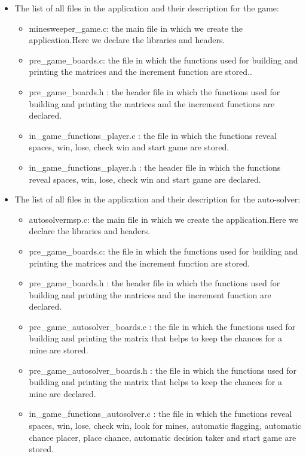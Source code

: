 \documentclass{article}
\begin{document}
\begin{itemize}
    
\item The list of all files in the application and their description for the game:
 \begin{itemize}
 	\item minesweeper\_game.c: the main file in which we create the application.Here we declare the libraries and headers.
 	\item pre\_game\_boards.c: the file in which the functions used for building and printing the matrices and the increment function are stored..
 	\item pre\_game\_boards.h : the header file in which the functions used for building and printing the matrices and the increment functions are declared.
 	\item in\_game\_functions\_player.c : the file in which the functions reveal spaces, win, lose, check win and start game are stored.
 	\item in\_game\_functions\_player.h : the header file in which the functions reveal spaces, win, lose, check win and start game are declared.
 	
 \end{itemize}
 
 
 \item The list of all files in the application and their description for the auto-solver:
 \begin{itemize}
 	\item autosolvermsp.c: the main file in which we create the application.Here we declare the libraries and headers.
 	
 	\item pre\_game\_boards.c: the file in which the functions used for building and printing the matrices and the increment function are stored.
 	
 	\item pre\_game\_boards.h : the header file in which the functions used for building and printing the matrices and the increment function are declared.
 	
 	\item pre\_game\_autosolver\_boards.c : the file in which the functions used for building and printing the matrix that helps to keep the chances for a mine are stored.
 	
 	\item pre\_game\_autosolver\_boards.h : the file in which the functions used for building and printing the matrix that helps to keep the chances for a mine are declared.
 	
 	\item in\_game\_functions\_autosolver.c : the file in which the functions reveal spaces, win, lose, check win, look for mines, automatic flagging, automatic chance placer, place chance, automatic decision taker and start game are stored.
 	

\end{itemize}
\end{itemize}
\end{document}
